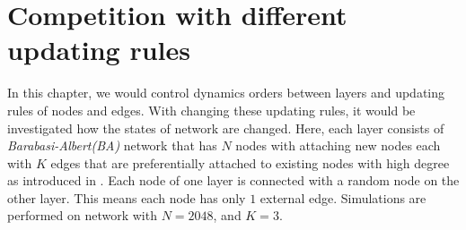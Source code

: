 
\chapter{Competition with different updating rules}
\label{chap4}
In this chapter, we would control dynamics orders between layers and updating rules of nodes and edges. With changing these updating rules, it would be investigated how the states of network are changed. Here, each layer consists of \textit{Barabasi-Albert(BA)} network that has $N$ nodes with attaching new nodes each with $K$ edges that are preferentially attached to existing nodes with high degree as introduced in \parencite{barabasi1999}. Each node of one layer is connected with a random node on the other layer. This means each node has only $1$ external edge. Simulations are performed on network with $N=2048$, and $K=3$.\\

